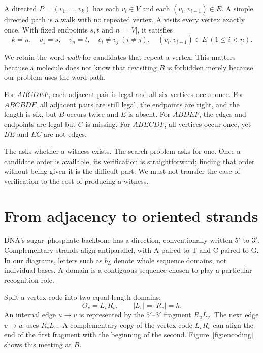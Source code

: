 \begin{definition}
A directed  $P=(v_1,\ldots,v_k)$ has each $v_i\in V$ and each $(v_i,v_{i+1})\in E$. A simple directed path is a walk with no repeated vertex. A  visits every vertex exactly once. With fixed endpoints $s,t$ and $n=|V|$, it satisfies
\[
 k=n,\quad v_1=s,\quad v_n=t,\quad
 v_i\ne v_j\ (i\ne j),\quad
 (v_i,v_{i+1})\in E\ (1\le i<n).
\]
\end{definition}

We retain the word \emph{walk} for candidates that repeat a vertex. This matters because a molecule does not know that revisiting $B$ is forbidden merely because our problem uses the word path.

For $ABCDEF$, each adjacent pair is legal and all six vertices occur once. For $ABCBDF$, all adjacent pairs are still legal, the endpoints are right, and the length is six, but $B$ occurs twice and $E$ is absent. For $ABDEF$, the edges and endpoints are legal but $C$ is missing. For $ABECDF$, all vertices occur once, yet $BE$ and $EC$ are not edges.

The  asks whether a witness exists. The search problem asks for one. Once a candidate order is available, its verification is straightforward; finding that order without being given it is the difficult part. We must not transfer the ease of verification to the cost of producing a witness.

\section{From adjacency to oriented strands}\label{sec:encoding}
DNA's sugar--phosphate backbone has a direction, conventionally written $5'$ to $3'$. Complementary strands align antiparallel, with A paired to T and C paired to G.\cite{dna} In our diagrams, letters such as $b_L$ denote whole sequence domains, not individual bases. A domain is a contiguous sequence chosen to play a particular recognition role.

Split a vertex code into two equal-length domains:
\[
 O_v=L_vR_v,\qquad |L_v|=|R_v|=h.
\]
An internal edge $u\to v$ is represented by the $5'$--$3'$ fragment $R_uL_v$. The next edge $v\to w$ uses $R_vL_w$. A complementary copy of the vertex code $L_vR_v$ can align the end of the first fragment with the beginning of the second. Figure~\ref{fig:encoding} shows this meeting at $B$.

